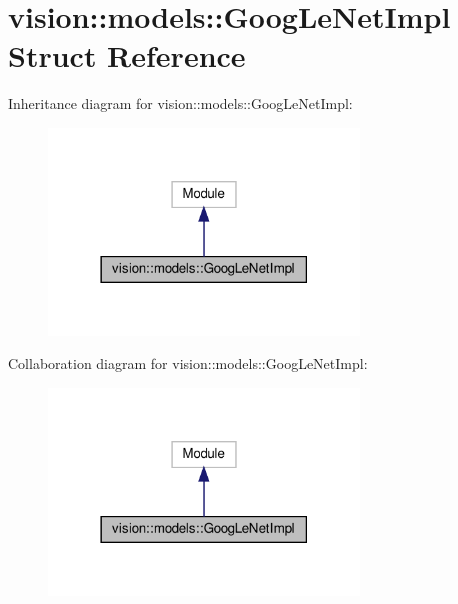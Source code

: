 \hypertarget{structvision_1_1models_1_1GoogLeNetImpl}{}\section{vision\+:\+:models\+:\+:Goog\+Le\+Net\+Impl Struct Reference}
\label{structvision_1_1models_1_1GoogLeNetImpl}


Inheritance diagram for vision\+:\+:models\+:\+:Goog\+Le\+Net\+Impl\+:
\nopagebreak
\begin{figure}[H]
\begin{center}
\leavevmode
\includegraphics[width=234pt]{structvision_1_1models_1_1GoogLeNetImpl__inherit__graph}
\end{center}
\end{figure}


Collaboration diagram for vision\+:\+:models\+:\+:Goog\+Le\+Net\+Impl\+:
\nopagebreak
\begin{figure}[H]
\begin{center}
\leavevmode
\includegraphics[width=234pt]{structvision_1_1models_1_1GoogLeNetImpl__coll__graph}
\end{center}
\end{figure}
